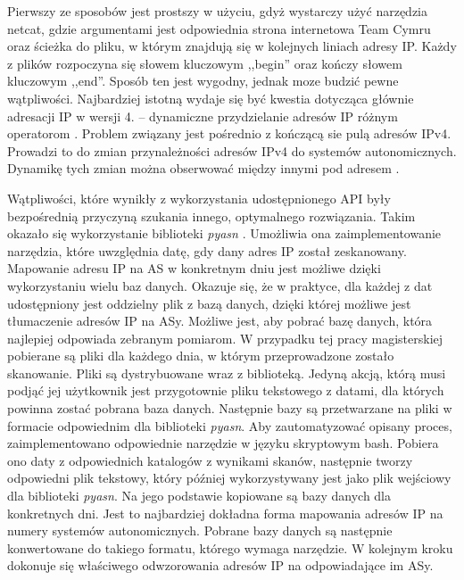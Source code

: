 Pierwszy ze sposobów jest prostszy w użyciu, gdyż wystarczy użyć narzędzia netcat\cite{netcat}, gdzie argumentami jest odpowiednia strona internetowa Team Cymru\cite{cymru} oraz ścieżka do pliku, w którym znajdują się w kolejnych liniach adresy IP. Każdy z plików rozpoczyna się słowem kluczowym ,,begin'' oraz kończy słowem kluczowym ,,end''. Sposób ten jest wygodny, jednak moze budzić pewne wątpliwości. Najbardziej istotną wydaje się być kwestia dotycząca głównie adresacji IP w wersji 4. -- dynamiczne przydzielanie adresów IP różnym operatorom \cite{}. Problem związany jest pośrednio z kończącą sie pulą adresów IPv4. Prowadzi to do zmian przynależności adresów IPv4 do systemów autonomicznych. Dynamikę tych zmian można obserwować między innymi pod adresem \cite{}. 

Wątpliwości, które wynikły z wykorzystania udostępnionego API były bezpośrednią przyczyną szukania innego, optymalnego rozwiązania. Takim okazało się wykorzystanie biblioteki \textit{pyasn} \cite{pyasn}. Umożliwia ona zaimplementowanie narzędzia, które uwzględnia datę, gdy dany adres IP został zeskanowany. Mapowanie adresu IP na AS w konkretnym dniu jest możliwe dzięki wykorzystaniu wielu baz danych. Okazuje się, że w praktyce, dla każdej z dat udostępniony jest oddzielny plik z bazą danych, dzięki której możliwe jest tłumaczenie adresów IP na ASy. Możliwe jest, aby pobrać bazę danych, która najlepiej odpowiada zebranym pomiarom. W przypadku tej pracy magisterskiej pobierane są pliki dla każdego dnia, w którym przeprowadzone zostało skanowanie. Pliki są dystrybuowane wraz z biblioteką. Jedyną akcją, którą musi podjąć jej użytkownik jest przygotownie pliku tekstowego z datami, dla których powinna zostać pobrana baza danych. Następnie bazy są przetwarzane na pliki w formacie odpowiednim dla biblioteki \textit{pyasn}. Aby zautomatyzować opisany proces, zaimplementowano odpowiednie narzędzie w języku skryptowym bash. Pobiera ono daty z odpowiednich katalogów z wynikami skanów, następnie tworzy odpowiedni plik tekstowy, który później wykorzystywany jest jako plik wejściowy dla biblioteki \textit{pyasn}. Na jego podstawie kopiowane są bazy danych dla konkretnych dni. Jest to najbardziej dokładna forma mapowania adresów IP na numery systemów autonomicznych. Pobrane bazy danych są następnie konwertowane do takiego formatu, którego wymaga narzędzie. W kolejnym kroku dokonuje się właściwego odwzorowania adresów IP na odpowiadające im ASy.

